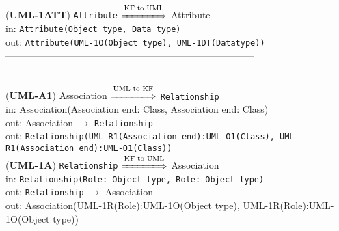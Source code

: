 \documentclass[sn-mathphys]{sn-jnl}
\begin{document}
{{({\bf UML-1ATT}) {\tt Attribute} $\overset{\text{KF to UML}}{\xLongrightarrow{\hspace*{1.4cm}}}$ {Attribute}\\
\hspace*{0.3cm}in: {\tt Attribute(Object type, Data type)}\\
\hspace*{0.5cm}out: {\tt Attribute(UML-1O(Object type), UML-1DT(Datatype))}\\

------------------------------------------------------------------------------
\\ \

({\bf UML-A1}) {Association} $\overset{\text{UML to KF}}{\xLongrightarrow{\hspace*{1.4cm}}}$ {\tt Relationship}\\
\hspace*{0.3cm}in: {Association(Association end: Class, Association end: Class)} \\
\hspace*{0.5cm}out:  {Association} $\rightarrow$ {\tt Relationship}\\
\hspace*{0.5cm}out:  {\tt Relationship(UML-R1(Association end):UML-O1(Class), UML-R1(Association end):UML-O1(Class))}\\

({\bf UML-1A}) {\tt Relationship} $\overset{\text{KF to UML}}{\xLongrightarrow{\hspace*{1.4cm}}}$ {Association}\\
\hspace*{0.3cm}in: {\tt Relationship(Role: Object type, Role: Object type)} \\
\hspace*{0.5cm}out:  {\tt Relationship} $\rightarrow$ {Association}\\
\hspace*{0.5cm}out:  {Association(UML-1R(Role):UML-1O(Object type), UML-1R(Role):UML-1O(Object type))}\\

}}
\end{document}
